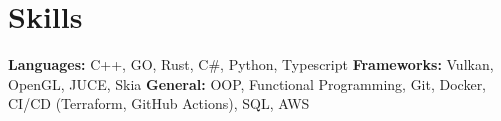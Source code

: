 \vspace{5 pt - 0.3 cm}
\section{Skills}
\begin{onecolentry}
    \textbf{Languages:} C++, GO, Rust, C\#, Python, Typescript \newline
    \textbf{Frameworks:} Vulkan, OpenGL, JUCE, Skia  \newline
    \textbf{General:} OOP, Functional Programming, Git, Docker, CI/CD (Terraform, GitHub Actions), SQL, AWS \newline
\end{onecolentry} 